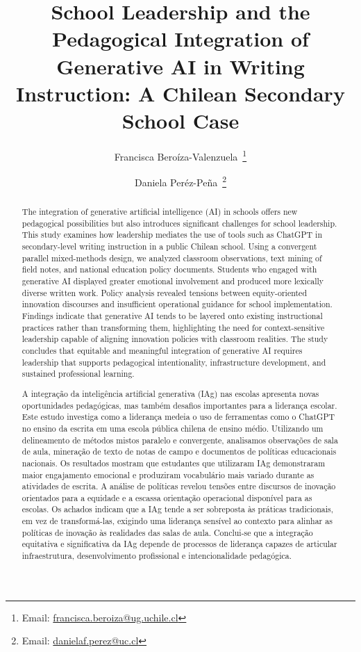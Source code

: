 \documentclass[english]{textolivre}
\title{School Leadership and the Pedagogical Integration of Generative AI in Writing Instruction: A Chilean Secondary School Case}
\author[1]{Francisca Beroíza-Valenzuela~\orcid{0000-0003-2424-1207}\thanks{Email: \href{mailto:francisca.beroiza@ug.uchile.cl}{francisca.beroiza@ug.uchile.cl}}}
\author[2]{Daniela Peréz-Peña~\orcid{0000-0002-5301-6271}\thanks{Email: \href{mailto:danielaf.perez@uc.cl}{danielaf.perez@uc.cl}}}
\affil[1]{Universidad de Las Américas, Faculty of Education, Santiago, Chile.}
\affil[2]{Pontificia Universidad Católica de Chile, Faculty of Education, Santiago, Chile.}
\begin{document}
\maketitle

\begin{polyabstract}
\begin{abstract}
The integration of generative artificial intelligence (AI) in schools offers new pedagogical possibilities but also introduces significant challenges for school leadership. This study examines how leadership mediates the use of tools such as ChatGPT in secondary-level writing instruction in a public Chilean school. Using a convergent parallel mixed-methods design, we analyzed classroom observations, text mining of field notes, and national education policy documents. Students who engaged with generative AI displayed greater emotional involvement and produced more lexically diverse written work. Policy analysis revealed tensions between equity-oriented innovation discourses and insufficient operational guidance for school implementation. Findings indicate that generative AI tends to be layered onto existing instructional practices rather than transforming them, highlighting the need for context-sensitive leadership capable of aligning innovation policies with classroom realities. The study concludes that equitable and meaningful integration of generative AI requires leadership that supports pedagogical intentionality, infrastructure development, and sustained professional learning.

\end{abstract}

\begin{portuguese}
\begin{abstract}
A integração da inteligência artificial generativa (IAg) nas escolas apresenta novas oportunidades pedagógicas, mas também desafios importantes para a liderança escolar. Este estudo investiga como a liderança medeia o uso de ferramentas como o ChatGPT no ensino da escrita em uma escola pública chilena de ensino médio. Utilizando um delineamento de métodos mistos paralelo e convergente, analisamos observações de sala de aula, mineração de texto de notas de campo e documentos de políticas educacionais nacionais. Os resultados mostram que estudantes que utilizaram IAg demonstraram maior engajamento emocional e produziram vocabulário mais variado durante as atividades de escrita. A análise de políticas revelou tensões entre discursos de inovação orientados para a equidade e a escassa orientação operacional disponível para as escolas. Os achados indicam que a IAg tende a ser sobreposta às práticas tradicionais, em vez de transformá-las, exigindo uma liderança sensível ao contexto para alinhar as políticas de inovação às realidades das salas de aula. Conclui-se que a integração equitativa e significativa da IAg depende de processos de liderança capazes de articular infraestrutura, desenvolvimento profissional e intencionalidade pedagógica.


\end{abstract}
\end{portuguese}
\end{polyabstract}
\end{document}
